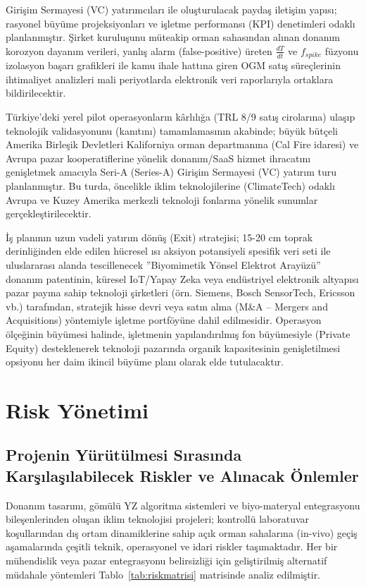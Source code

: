 \documentclass[11pt,a4paper]{article}
\begin{document}
Girişim Sermayesi (VC) yatırımcıları ile oluşturulacak paydaş iletişim yapısı; rasyonel büyüme projeksiyonları ve işletme performansı (KPI) denetimleri odaklı planlanmıştır. Şirket kuruluşunu müteakip orman sahasından alınan donanım korozyon dayanım verileri, yanlış alarm (false-positive) üreten $\frac{dT}{dt}$ ve $f_{spike}$ füzyonu izolasyon başarı grafikleri ile kamu ihale hattına giren OGM satış süreçlerinin ihtimaliyet analizleri mali periyotlarda elektronik veri raporlarıyla ortaklara bildirilecektir.

Türkiye'deki yerel pilot operasyonların kârlılığa (TRL 8/9 satış cirolarına) ulaşıp teknolojik validasyonunu (kanıtını) tamamlamasının akabinde; büyük bütçeli Amerika Birleşik Devletleri Kaliforniya orman departmanına (Cal Fire idaresi) ve Avrupa pazar kooperatiflerine yönelik donanım/SaaS hizmet ihracatını genişletmek amacıyla Seri-A (Series-A) Girişim Sermayesi (VC) yatırım turu planlanmıştır. Bu turda, öncelikle iklim teknolojilerine (ClimateTech) odaklı Avrupa ve Kuzey Amerika merkezli teknoloji fonlarına yönelik sunumlar gerçekleştirilecektir.

İş planının uzun vadeli yatırım dönüş (Exit) stratejisi; 15-20 cm toprak derinliğinden elde edilen hücresel ısı aksiyon potansiyeli spesifik veri seti ile uluslararası alanda tescillenecek ''Biyomimetik Yönsel Elektrot Arayüzü'' donanım patentinin, küresel IoT/Yapay Zeka veya endüstriyel elektronik altyapısı pazar payına sahip teknoloji şirketleri (örn. Siemens, Bosch SensorTech, Ericsson vb.) tarafından, stratejik hisse devri veya satın alma (M\&A -- Mergers and Acquisitions) yöntemiyle işletme portföyüne dahil edilmesidir. Operasyon ölçeğinin büyümesi halinde, işletmenin yapılandırılmış fon büyümesiyle (Private Equity) desteklenerek teknoloji pazarında organik kapasitesinin genişletilmesi opsiyonu her daim ikincil büyüme planı olarak elde tutulacaktır.

\section{Risk Yönetimi}

\subsection{Projenin Yürütülmesi Sırasında Karşılaşılabilecek Riskler ve Alınacak Önlemler}

Donanım tasarımı, gömülü YZ algoritma sistemleri ve biyo-materyal entegrasyonu bileşenlerinden oluşan iklim teknolojisi projeleri; kontrollü laboratuvar koşullarından dış ortam dinamiklerine sahip açık orman sahalarına (in-vivo) geçiş aşamalarında çeşitli teknik, operasyonel ve idari riskler taşımaktadır. Her bir mühendislik veya pazar entegrasyonu belirsizliği için geliştirilmiş alternatif müdahale yöntemleri Tablo~\ref{tab:riskmatrisi} matrisinde analiz edilmiştir.
\end{document}
